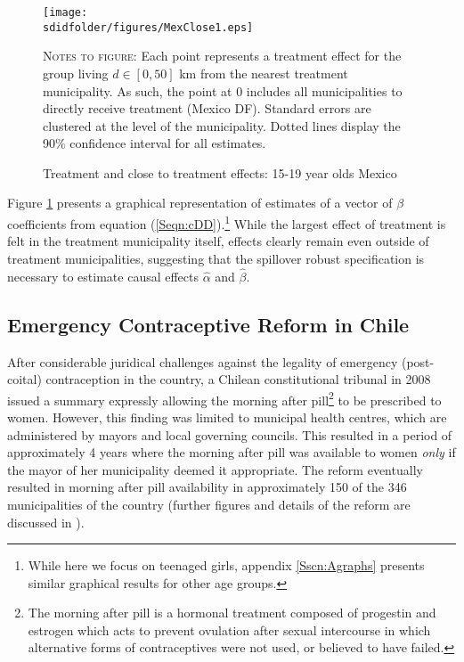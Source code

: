 \begin{figure}[h!]
\texttt{[image: \\sdidfolder/figures/MexClose1.eps]}
\caption{Treatment and close to treatment effects: 15-19 year olds Mexico}
\label{SFig:MexClose}
\vspace{2mm}
\begin{footnotesize}
\textsc{Notes to figure}: Each point represents a treatment effect for the group
living $d\in [0,50]$ km from the nearest treatment municipality.  As such, the
point at 0 includes all municipalities to directly receive treatment (Mexico DF).
Standard errors are clustered at the level of the municipality.  Dotted lines 
display the 90\% confidence interval for all estimates.
\end{footnotesize}
\end{figure}
Figure \ref{SFig:MexClose} presents a graphical representation of estimates
of a vector of $\beta$ coefficients from equation (\ref{Seqn:cDD}).\footnote{
While here we focus on teenaged girls, appendix \ref{Sscn:Agraphs} presents
similar graphical results for other age groups.}  While the largest effect of 
treatment is felt in the treatment municipality itself, effects clearly remain 
even outside of treatment municipalities, suggesting that the spillover robust 
specification is necessary to estimate causal effects $\hat\alpha$ and 
$\hat\beta$.

\subsection{Emergency Contraceptive Reform in Chile}
After considerable juridical challenges against the legality of emergency 
(post-coital) contraception in the country, a Chilean constitutional tribunal in 
2008 issued a summary expressly allowing the morning after pill\footnote{The morning
  after pill is a hormonal treatment composed of progestin and estrogen which acts
to prevent ovulation after sexual intercourse in which alternative forms of 
contraceptives were not used, or believed to have failed.} to be prescribed
to women.  However, this finding was limited to municipal health centres, which
are administered by mayors and local governing councils.  This resulted in a 
period of approximately 4 years where the morning after pill was available to
women \emph{only} if the mayor of her municipality deemed it appropriate.  The
reform eventually resulted in morning after pill availability in approximately
150 of the 346 municipalities of the country (further figures and details of the
reform are discussed in \citet{Clarke2014}).

